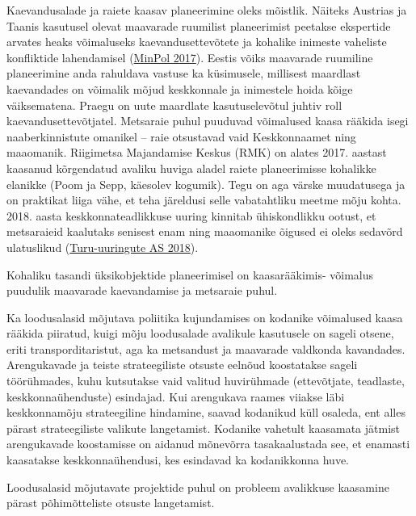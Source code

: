 \documentclass[estonian,]{article}
\begin{document}
Kaevandusalade ja raiete kaasav planeerimine oleks mõistlik. Näiteks Austrias ja Taanis kasutusel olevat maavarade ruumilist planeerimist peetakse ekspertide arvates heaks võimaluseks kaevandusettevõtete ja kohalike inimeste vaheliste konfliktide lahendamisel (\protect\hyperlink{MinPol2017}{MinPol 2017}). Eestis võiks maavarade ruumiline planeerimine anda rahuldava vastuse ka küsimusele, millisest maardlast kaevandades on võimalik mõjud keskkonnale ja inimestele hoida kõige väiksematena. Praegu on uute maardlate kasutuselevõtul juhtiv roll kaevandusettevõtjatel. Metsaraie puhul puuduvad võimalused kaasa rääkida isegi naaberkinnistute omanikel -- raie otsustavad vaid Keskkonnaamet ning maaomanik. Riigimetsa Majandamise Keskus (RMK) on alates 2017. aastast kaasanud kõrgendatud avaliku huviga aladel raiete planeerimisse kohalikke elanikke (Poom ja Sepp, käesolev kogumik). Tegu on aga värske muudatusega ja on praktikat liiga vähe, et teha järeldusi selle vabatahtliku meetme mõju kohta. 2018. aasta keskkonnateadlikkuse uuring kinnitab ühiskondlikku ootust, et metsaraieid kaalutaks senisest enam ning maaomanike õigused ei oleks sedavõrd ulatuslikud (\protect\hyperlink{Turu-uuringute2018}{Turu-uuringute AS 2018}).

\begin{blockquote-left}
Kohaliku tasandi üksikobjektide planeerimisel on kaasarääkimis- võimalus
puudulik maavarade kaevandamise ja metsaraie puhul.
\end{blockquote-left}

Ka loodusalasid mõjutava poliitika kujundamises on kodanike võimalused kaasa rääkida piiratud, kuigi mõju loodusalade avalikule kasutusele on sageli otsene, eriti transporditaristut, aga ka metsandust ja maavarade valdkonda kavandades. Arengukavade ja teiste strateegiliste otsuste eelnõud koostatakse sageli töörühmades, kuhu kutsutakse vaid valitud huvirühmade (ettevõtjate, teadlaste, keskkonnaühenduste) esindajad. Kui arengukava raames viiakse läbi keskkonnamõju strateegiline hindamine, saavad kodanikud küll osaleda, ent alles pärast strateegiliste valikute langetamist. Kodanike vahetult kaasamata jätmist arengukavade koostamisse on aidanud mõnevõrra tasakaalustada see, et enamasti kaasatakse keskkonnaühendusi, kes esindavad ka kodanikkonna huve.

\begin{blockquote-right}
Loodusalasid mõjutavate projektide puhul on probleem avalikkuse
kaasamine pärast põhimõtteliste otsuste langetamist.
\end{blockquote-right}
\end{document}
